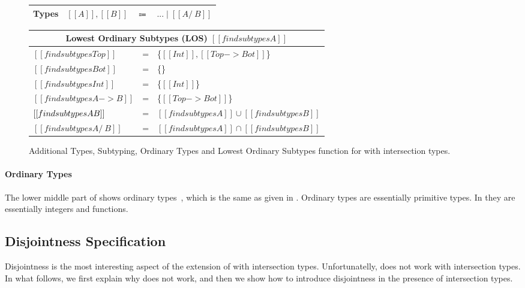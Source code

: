 \begin{figure}[t]
    \centering
    \begin{tabular}{lrcl} \toprule
      Types & $[[A]], [[B]]$ & $\Coloneqq$ & $ ... \mid [[A /\ B]] $ \\
      \bottomrule
    \end{tabular}
  \medskip
    \centering
  \medskip
    \centering
  \medskip
    \centering
    {\renewcommand{\arraystretch}{1.2}
    \begin{tabular}{|lcl|}
      \multicolumn{3}{c}{Lowest Ordinary Subtypes (LOS) $[[findsubtypes A]]$} \\
      \hline
     $[[findsubtypes Top]]$ & = & \{$ [[Int]], [[Top -> Bot]]$\}  \\
     $[[findsubtypes Bot]]$ & = & \{\}  \\
     $[[findsubtypes Int]]$ & = & \{$ [[Int]] $\}  \\
     $[[findsubtypes A -> B]]$ & = & \{$ [[Top -> Bot]] $\}  \\
     $[[findsubtypes A \/ B]]$ & = & $ [[findsubtypes A]] \cup [[findsubtypes B]] $\\
     $[[findsubtypes A /\ B]]$ & = & $ [[findsubtypes A]] \cap [[findsubtypes B]] $\\
      \hline
    \end{tabular} }
  \caption{Additional Types, Subtyping, Ordinary Types and Lowest Ordinary Subtypes function for \cal with intersection types.}
  \label{fig:inter:system}
\end{figure}

\paragraph{Ordinary Types}
The lower middle part of
 shows ordinary types~\cite{}, which is the same as given
in .
Ordinary types are essentially primitive types. In \cal they
are essentially integers and functions. 

\subsection{Disjointness Specification}
\label{sec:inter:disj}
Disjointness is the most interesting aspect of the extension of \cal with
intersection types. Unfortunatelly,  does not work with intersection
types. In what follows, we first explain why  does not work, and then
we show how to introduce disjointness in the presence of intersection types. 

